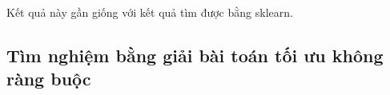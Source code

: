 




Kết quả này gần giống với kết quả tìm được bằng sklearn.

\subsection{Tìm nghiệm bằng giải bài toán tối ưu không ràng buộc }

